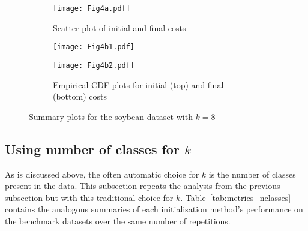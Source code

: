 \begin{figure}
    \begin{subfigure}{.5\textwidth}
        \texttt{[image: Fig4a.pdf]}
        \caption{Scatter plot of initial and final costs}
    \end{subfigure}
    \hfill%
    \begin{subfigure}{.5\textwidth}
        \texttt{[image: Fig4b1.pdf]}

        \texttt{[image: Fig4b2.pdf]}
        \caption{Empirical CDF plots for initial (top) and final (bottom) costs}
    \end{subfigure}
    \caption{Summary plots for the soybean dataset with \(k=8\)}%
    \label{fig:soybean_knee}
\end{figure}


\subsection{Using number of classes for \(k\)}\label{subsec:nclasses}

As is discussed above, the often automatic choice for \(k\) is the number of
classes present in the data. This subsection repeats the analysis from the
previous subsection but with this traditional choice for \(k\).
Table~\ref{tab:metrics_nclasses} contains the analogous summaries of each
initialisation method's performance on the benchmark datasets over the same
number of repetitions.

